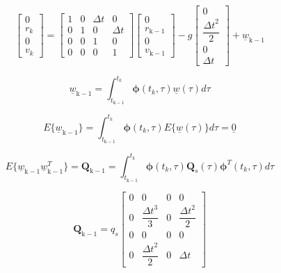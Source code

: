\documentclass{article}
\begin{document}
\begin{equation*}
    \begin{bmatrix} 0 \\ r_k \\ 0 \\ v_k \end{bmatrix} = 
    \begin{bmatrix}
        1 & 0 & \Delta t & 0\\
        0 & 1 & 0 & \Delta t \\
        0 & 0 & 1 & 0 \\
        0 & 0 & 0 & 1
    \end{bmatrix}
    \begin{bmatrix} 0\\r_\mathrm{k-1}\\0\\v_\mathrm{k-1} \end{bmatrix} - g
    \begin{bmatrix}
        0 \\
        \dfrac{{\Delta t}^2}{2} \\
        0 \\
        \Delta t
    \end{bmatrix}
    +
    \underline{w}_\mathrm{k-1}
\end{equation*}

\begin{equation}
    \underline{w}_\mathrm{k-1} = \int_{t_\mathrm{k-1}}^{t_k} \boldsymbol{\phi}(t_k, \tau)\underline{w}(\tau)d\tau
\end{equation}

\begin{equation}
    E\{\underline{w}_\mathrm{k-1}\} = \int_{t_\mathrm{k-1}}^{t_k} \boldsymbol{\phi}(t_k, \tau)E\{\underline{w}(\tau)\}d\tau = \underline{0}
\end{equation}

\begin{equation}
    E\{\underline{w}_\mathrm{k-1}\underline{w}_\mathrm{k-1}^T\} = \mathbf{Q}_\mathrm{k-1} = 
    \int_{t_\mathrm{k-1}}^{t_k} \boldsymbol{\phi}(t_k, \tau)\mathbf{Q}_s(\tau)\boldsymbol{\phi}^T(t_k, \tau)d\tau
\end{equation}

\begin{equation*}
    \mathbf{Q}_\mathrm{k-1} = q_s
    \begin{bmatrix}
        0 & 0 & 0 & 0\\
        0 & \dfrac{{\Delta t}^3}{3} & 0 & \dfrac{{\Delta t}^2}{2} \\
        0 & 0 & 0 & 0 \\
        0 & \dfrac{{\Delta t}^2}{2} & 0 & \Delta t
    \end{bmatrix}
\end{equation*}
\end{document}
